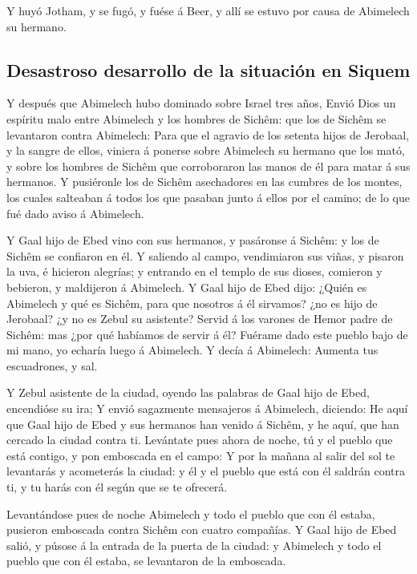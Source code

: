  Y huyó Jotham, y se fugó, y fuése á Beer, y allí se estuvo
por causa de Abimelech su hermano.

\hypertarget{desastroso-desarrollo-de-la-situaciuxf3n-en-siquem}{%
\subsection{Desastroso desarrollo de la situación en
Siquem}\label{desastroso-desarrollo-de-la-situaciuxf3n-en-siquem}}

 Y después que Abimelech hubo dominado sobre Israel tres
años,  Envió Dios un espíritu malo entre Abimelech y los
hombres de Sichêm: que los de Sichêm se levantaron contra Abimelech:
 Para que el agravio de los setenta hijos de Jerobaal, y la
sangre de ellos, viniera á ponerse sobre Abimelech su hermano que los
mató, y sobre los hombres de Sichêm que corroboraron las manos de él
para matar á sus hermanos.  Y pusiéronle los de Sichêm
asechadores en las cumbres de los montes, los cuales salteaban á todos
los que pasaban junto á ellos por el camino; de lo que fué dado aviso á
Abimelech.

 Y Gaal hijo de Ebed vino con sus hermanos, y pasáronse á
Sichêm: y los de Sichêm se confiaron en él.  Y saliendo al
campo, vendimiaron sus viñas, y pisaron la uva, é hicieron alegrías; y
entrando en el templo de sus dioses, comieron y bebieron, y maldijeron á
Abimelech.  Y Gaal hijo de Ebed dijo: ¿Quién es Abimelech y
qué es Sichêm, para que nosotros á él sirvamos? ¿no es hijo de Jerobaal?
¿y no es Zebul su asistente? Servid á los varones de Hemor padre de
Sichêm: mas ¿por qué habíamos de servir á él?  Fuérame dado
este pueblo bajo de mi mano, yo echaría luego á Abimelech. Y decía á
Abimelech: Aumenta tus escuadrones, y sal.

 Y Zebul asistente de la ciudad, oyendo las palabras de
Gaal hijo de Ebed, encendióse su ira;  Y envió sagazmente
mensajeros á Abimelech, diciendo: He aquí que Gaal hijo de Ebed y sus
hermanos han venido á Sichêm, y he aquí, que han cercado la ciudad
contra ti.  Levántate pues ahora de noche, tú y el pueblo
que está contigo, y pon emboscada en el campo:  Y por la
mañana al salir del sol te levantarás y acometerás la ciudad: y él y el
pueblo que está con él saldrán contra ti, y tu harás con él según que se
te ofrecerá.

 Levantándose pues de noche Abimelech y todo el pueblo que
con él estaba, pusieron emboscada contra Sichêm con cuatro compañías.
 Y Gaal hijo de Ebed salió, y púsose á la entrada de la
puerta de la ciudad: y Abimelech y todo el pueblo que con él estaba, se
levantaron de la emboscada.

